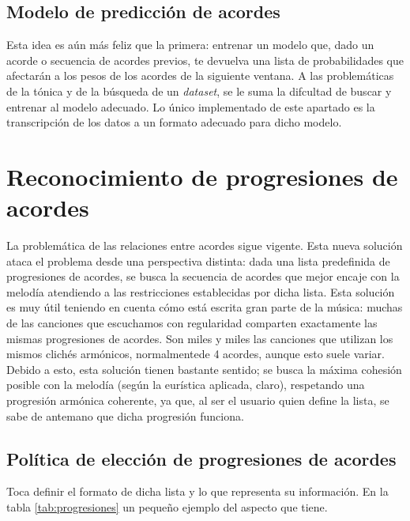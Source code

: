 \subsection{Modelo de predicción de acordes}

Esta idea es aún más feliz que la primera: entrenar un modelo que, dado un acorde o secuencia de acordes previos, te devuelva una lista de probabilidades que afectarán a los pesos de los acordes de la siguiente ventana. A las problemáticas de la tónica y de la búsqueda de un \textit{dataset}, se le suma la difcultad de buscar y entrenar al modelo adecuado. Lo único implementado de este apartado es la transcripción de los datos a un formato adecuado para dicho modelo.

\section{Reconocimiento de progresiones de acordes}

La problemática de las relaciones entre acordes sigue vigente. Esta nueva solución ataca el problema desde una perspectiva distinta: dada una lista predefinida de progresiones de acordes, se busca la secuencia de acordes que mejor encaje con la melodía atendiendo a las restricciones establecidas por dicha lista. Esta solución es muy útil teniendo en cuenta cómo está escrita gran parte de la música: muchas de las canciones que escuchamos con regularidad comparten exactamente las mismas progresiones de acordes. Son miles y miles las canciones que utilizan los mismos clichés armónicos, normalmentede 4 acordes, aunque esto suele variar. Debido a esto, esta solución tienen bastante sentido; se busca la máxima cohesión posible con la melodía (según la eurística aplicada, claro), respetando una progresión armónica coherente, ya que, al ser el usuario quien define la lista, se sabe de antemano que dicha progresión funciona.

\subsection{Política de elección de progresiones de acordes}\label{arm:sebsebsec:politica}

Toca definir el formato de dicha lista y lo que representa su información. En la tabla \ref{tab:progresiones} un pequeño ejemplo del aspecto que tiene.

